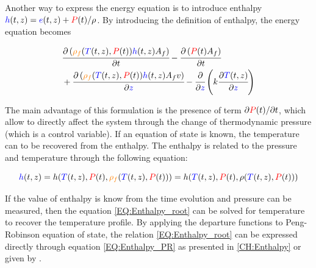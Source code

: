 \documentclass[../Article_Model_Parameters.tex]{subfiles}
\begin{document}
			Another way to express the energy equation is to introduce enthalpy ${\color{blue}h}(t,z) = {\color{blue}e}(t,z) + {\color{red}P}(t) / \rho$. By introducing the definition of enthalpy, the energy equation becomes
			
			{\footnotesize
				\begin{align}
					&\cfrac{\partial \left({\color{orange}\rho_f}({\color{blue}T}(t,z),{\color{red}P}(t)) {\color{blue}h}(t,z) A_f\right)}{\partial t} - \cfrac{\partial \left({\color{red}P}(t) A_f\right)}{\partial t} \nonumber \\
					&+ \cfrac{\partial \left( {\color{orange}\rho_f}({\color{blue}T}(t,z),{\color{red}P}(t)) {\color{blue}h}(t,z) A_f v \right)}{\partial {\color{blue}z}} - \cfrac{\partial}{\partial {\color{blue}z}} \left( k \cfrac{\partial {\color{blue}T}(t,z)}{\partial {\color{blue}z}} \right)
				\end{align}
			}
		
			The main advantage of this formulation is the presence of term $\partial {\color{red}P}(t) / \partial t $, which allow to directly affect the system through the change of thermodynamic pressure (which is a control variable).
			If an equation of state is known, the temperature can to be recovered from the enthalpy. The enthalpy is related to the pressure and temperature through the following equation:
			
			{\footnotesize
				\begin{equation}
					{\color{blue}h}(t,z)=h({\color{blue}T}(t,z),{\color{red}P}(t),{\color{orange}\rho_f}({\color{blue}T}(t,z),{\color{red}P}(t)))=h( {\color{blue}T}(t,z),{\color{red}P}(t), \rho({\color{blue}T}(t,z),{\color{red}P}(t)) ) 
					\label{EQ:Enthalpy_root}
				\end{equation}
			}
		
			If the value of enthalpy is know from the time evolution and pressure can be measured, then the equation \ref{EQ:Enthalpy_root} can be solved for temperature to recover the temperature profile. By applying the departure functions to Peng-Robinson equation of state, the relation \ref{EQ:Enthalpy_root} can be expressed directly through equation \ref{EQ:Enthalpy_PR} as presented in \ref{CH:Enthalpy} or given by \citet{Gmehling2019}.
			
\end{document}
